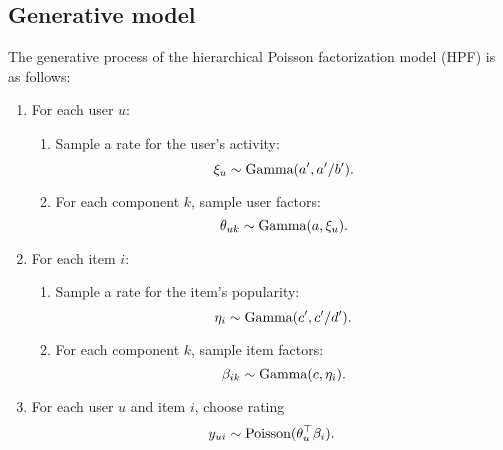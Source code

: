 
\subsection{Generative model}
The generative process of the hierarchical Poisson factorization model
(HPF) is as follows:
\begin{enumerate}
\item For each user $u$:
  \begin{enumerate}
    \item Sample a rate for the user's activity:
      \begin{equation*}
        \xi_u \sim \textrm{Gamma}(a', a'/b').
      \end{equation*}
    \item For each component $k$, sample user factors:
      \begin{equation*}
        \theta_{uk} \sim \textrm{Gamma}(a, \xi_u).
      \end{equation*}
  \end{enumerate}

\item For each item $i$:
  \begin{enumerate}
    \item Sample a rate for the item's popularity:
      \begin{equation*}
        \eta_i \sim \textrm{Gamma}(c', c'/d').
      \end{equation*}
    \item For each component $k$, sample item factors:
      \begin{equation*}
        \beta_{ik} \sim \textrm{Gamma}(c, \eta_i).
      \end{equation*}
  \end{enumerate}

\item For each user $u$ and item $i$, choose rating
  \begin{equation*}
    y_{ui} \sim \textrm{Poisson}(\theta_u^\top \beta_i).
  \end{equation*}
\end{enumerate}



